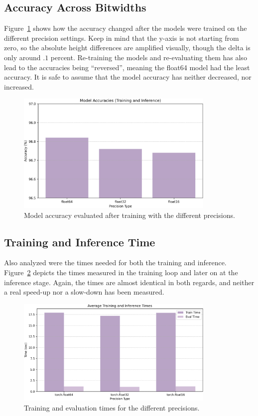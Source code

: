 \documentclass[11pt]{article}
\begin{document}
\subsection*{Accuracy Across Bitwidths}
Figure~\ref{fig:modelAccTrainAndInf} shows how the accuracy changed after the
models were trained on the different precision settings. Keep in mind that the
y-axis is not starting from zero, so the absolute height differences are
amplified visually, though the delta is only around $.1$ percent. Re-training
the models and re-evaluating them has also lead to the accuracies being
``reversed'', meaning the float64 model had the least accuracy. It is safe to
assume that the model accuracy has neither decreased, nor increased.
\begin{figure}[H]
	\centering
	\includegraphics[width=0.85\textwidth]{figures/trainingAndInference.png}
	\caption{Model accuracy evaluated after training with the different precisions.}\label{fig:modelAccTrainAndInf}
\end{figure}

\subsection*{Training and Inference Time}
Also analyzed were the times needed for both the training and inference.
Figure~\ref{fig:modelEvalTrainTimes} depicts the times measured in the training
loop and later on at the inference stage. Again, the times are almost identical
in both regards, and neither a real speed-up nor a slow-down has been measured.
\begin{figure}[H]
	\centering
	\includegraphics[width=0.85\textwidth]{figures/times.png}
	\caption{Training and evaluation times for the different precisions.}\label{fig:modelEvalTrainTimes}
\end{figure}
\end{document}

